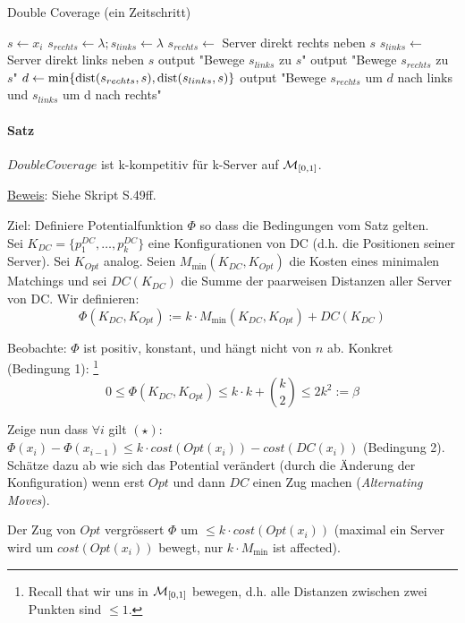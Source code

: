 \begin{algorithm}[h]
\caption{Double Coverage (ein Zeitschritt)}
\begin{algorithmic}
    \State $s \gets x_i$
    \State $s_{rechts} \gets \lambda; s_{links} \gets \lambda$
    \State $s_{rechts} \gets $ Server direkt rechts neben $s$
    \State $s_{links} \gets $ Server direkt links neben $s$
        \State output "Bewege $s_{links}$ zu $s$"
    \State output "Bewege $s_{rechts}$ zu $s$"
    \Else
    \State $d \gets \min \{ \text{dist}(s_{rechts} , s), \text{dist}(s_{links} , s) \}$
    \State output "Bewege $s_{rechts}$ um $d$ nach links und $s_{links}$ um d nach rechts"
    \EndIf
\end{algorithmic}
\end{algorithm}

\paragraph{Satz}
$DoubleCoverage$ ist k-kompetitiv für k-Server auf $\mathcal{M}_{[0,1]}$.

\underline{Beweis}:
Siehe Skript S.49ff.

Ziel: Definiere Potentialfunktion $\Phi$ so dass die Bedingungen vom Satz gelten.
\\
Sei $K_{DC} = \{p_1^{DC}, \dots , p_k^{DC}\}$ eine Konfigurationen von DC (d.h. die Positionen seiner Server).
Sei $K_{Opt}$ analog.
Seien $M_{\min} (K_{DC}, K_{Opt})$ die Kosten eines minimalen Matchings
und sei $DC(K_{DC})$ die Summe der paarweisen Distanzen aller Server von DC.
Wir definieren:
$$\Phi (K_{DC}, K_{Opt}) := k \cdot M_{\min} (K_{DC}, K_{Opt}) + DC(K_{DC}) $$

Beobachte: $\Phi$ ist positiv, konstant, und hängt nicht von $n$ ab. Konkret (Bedingung 1):
\footnote{Recall that wir uns in $\mathcal{M}_{[0,1]}$ bewegen, d.h. alle Distanzen zwischen zwei Punkten sind $\leq 1$.}
$$ 0 \leq \Phi (K_{DC}, K_{Opt}) \leq k \cdot k + \binom{k}{2} \leq 2 k^2 := \beta $$

Zeige nun dass $\forall i$ gilt $(\star)$:
$ \Phi(x_i) - \Phi(x_{i-1}) \leq k \cdot cost(Opt(x_i)) - cost (DC(x_i)) $ (Bedingung 2).
\\
Schätze dazu ab wie sich das Potential verändert (durch die Änderung der Konfiguration)
wenn erst $Opt$ und dann $DC$ einen Zug machen (\emph{Alternating Moves}).

Der Zug von $Opt$ vergrössert $\Phi$ um $\leq k \cdot cost(Opt(x_i))$
(maximal ein Server wird um $cost(Opt(x_i))$ bewegt, nur $k \cdot M_{\min}$ ist affected).

